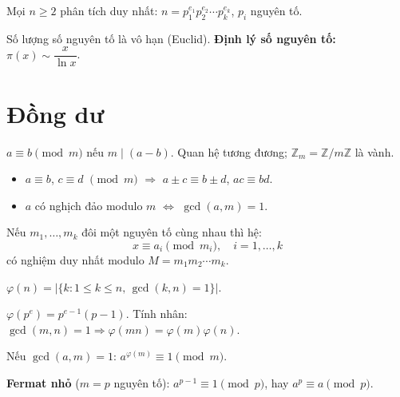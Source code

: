 \documentclass[12pt,a4paper]{article}
\begin{document}
\begin{dinhly}[title={Định lý cơ bản của số học}]
  Mọi $n \ge 2$ phân tích duy nhất: $n = p_1^{e_1} p_2^{e_2} \cdots p_k^{e_k}$, $p_i$ nguyên tố.
\end{dinhly}

\begin{dinhly}
  Số lượng số nguyên tố là vô hạn (Euclid). \textbf{Định lý số nguyên tố:} $\pi(x) \sim \dfrac{x}{\ln x}$.
\end{dinhly}

\section{Đồng dư}

\begin{dinhnghia}
  $a \equiv b \pmod{m}$ nếu $m \mid (a - b)$. Quan hệ tương đương; $\mathbb{Z}_m = \mathbb{Z}/m\mathbb{Z}$ là vành.
\end{dinhnghia}

\begin{tinhchat}
  \begin{itemize}
    \item $a \equiv b$, $c \equiv d$ $\pmod{m}$ $\Rightarrow$ $a \pm c \equiv b \pm d$, $ac \equiv bd$.
    \item $a$ có nghịch đảo modulo $m$ $\Leftrightarrow$ $\gcd(a, m) = 1$.
  \end{itemize}
\end{tinhchat}

\begin{dinhly}[title={Định lý thặng dư Trung Hoa (CRT)}]
  Nếu $m_1, \ldots, m_k$ đôi một nguyên tố cùng nhau thì hệ:
  \[
    x \equiv a_i \pmod{m_i}, \quad i = 1, \ldots, k
  \]
  có nghiệm duy nhất modulo $M = m_1 m_2 \cdots m_k$.
\end{dinhly}

\begin{dinhnghia}[title={Hàm Euler}]
  $\varphi(n) = |\{k : 1 \le k \le n,\, \gcd(k, n) = 1\}|$.

  $\varphi(p^e) = p^{e-1}(p-1)$. Tính nhân: $\gcd(m,n)=1 \Rightarrow \varphi(mn) = \varphi(m)\varphi(n)$.
\end{dinhnghia}

\begin{dinhly}[title={Euler--Fermat}]
  Nếu $\gcd(a, m) = 1$: $a^{\varphi(m)} \equiv 1 \pmod{m}$.

  \textbf{Fermat nhỏ} ($m = p$ nguyên tố): $a^{p-1} \equiv 1 \pmod{p}$, hay $a^p \equiv a \pmod{p}$.
\end{dinhly}
\end{document}
